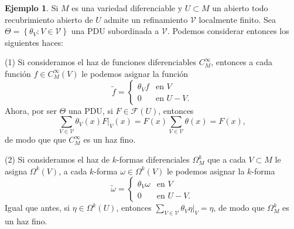 \documentclass[12pt,a4paper]{book}
\theoremstyle{definition} \newtheorem{defn}[thm]{Definición}
\theoremstyle{definition} \newtheorem{ejemplo}[thm]{Ejemplo}
\theoremstyle{definition} \newtheorem{ejercicio}[thm]{Ejercicio}
\theoremstyle{remark} \newtheorem*{obs}{Observación}
\def\FF{\mathscr{F}}
\begin{document}
	  \begin{ejemplo}
	    Si $M$ es una variedad diferenciable y $U\subset M$ un abierto todo recubrimiento abierto de $U$ admite un refinamiento $\mathcal{V}$ localmente finito. Sea $\Theta=\left\{ \theta_V:V\in \mathcal{V} \right\}$ una PDU subordinada a $\mathcal{V}$. Podemos considerar entonces los siguientes haces:

	      (1) Si consideramos el haz de funciones diferenciables $C^\infty_M$, entonces a cada función $f\in C^\infty_M(V)$ le podemos asignar la función 
		\begin{equation*}
		  \tilde{f}=
		  \begin{cases}
		    \theta_V f & \text{en } V \\
		    0 & \text{en } U-V.
		  \end{cases}
		\end{equation*}
		Ahora, por ser $\Theta$ una PDU, si $F\in \FF(U)$, entonces $$\sum_{V\in \mathcal{V}} \theta_V(x) F|_{V}(x) =F(x)\sum_{V\in \mathcal{V}}\theta(x)=F(x),$$ de modo que que $C^\infty_M$ es un haz fino.
	      
		(2) Si consideramos el haz de $k$-formas diferenciales $\Omega^k_M$ que a cada $V\subset M$ le asigna $\Omega^k(V)$, a cada $k$-forma $\omega \in \Omega^k(V)$ le podemos asignar la $k$-forma
		\begin{equation*}
		  \tilde{\omega}=
		  \begin{cases}
		    \theta_V \omega & \text{en } V \\
		    0 & \text{en } U-V.
		  \end{cases}
		\end{equation*}
		Igual que antes, si $\eta \in \Omega^k(U)$, entonces $\sum_{V\in \mathcal{V}} \theta_V \eta|_{V}=\eta$, de modo que $\Omega^k_M$ es un haz fino.
	      

\end{ejemplo}
\end{document}
